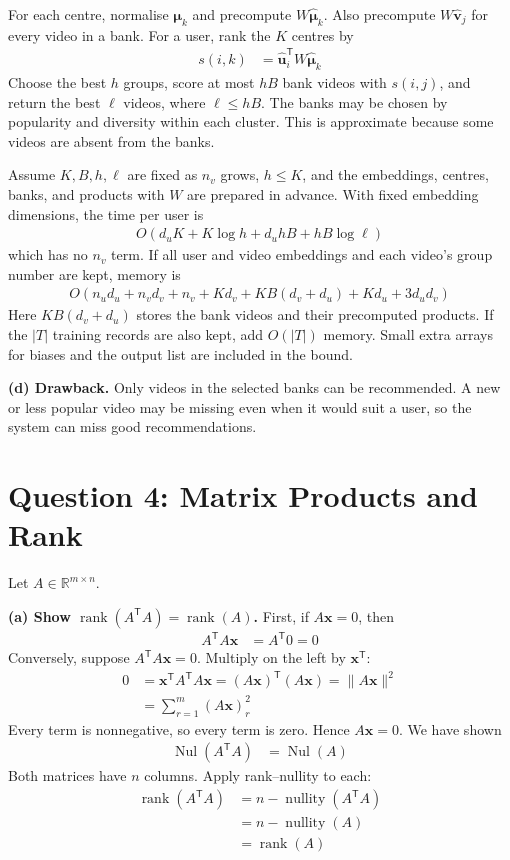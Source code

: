 \documentclass[11pt,a4paper]{article}
\newcommand{\R}{\mathbb{R}}
\newcommand{\norm}[1]{\lVert #1\rVert}
\newcommand{\rank}{\operatorname{rank}}
\newcommand{\nullity}{\operatorname{nullity}}
\newcommand{\Nul}{\operatorname{Nul}}
\begin{document}
For each centre, normalise $\boldsymbol\mu_k$ and precompute $W\widehat{\boldsymbol\mu}_k$. Also precompute $W\widehat{\mathbf v}_j$ for every video in a bank. For a user, rank the $K$ centres by
\begin{align*}
s(i,k)&=\widehat{\mathbf u}_i^{\mathsf T}W\widehat{\boldsymbol\mu}_k
\end{align*}
Choose the best $h$ groups, score at most $hB$ bank videos with $s(i,j)$, and return the best $\ell$ videos, where $\ell\le hB$. The banks may be chosen by popularity and diversity within each cluster. This is approximate because some videos are absent from the banks.

Assume $K,B,h,\ell$ are fixed as $n_v$ grows, $h\le K$, and the embeddings, centres, banks, and products with $W$ are prepared in advance. With fixed embedding dimensions, the time per user is
\begin{align*}
O\!\left(d_uK+K\log h+d_uhB+hB\log\ell\right)
\end{align*}
which has no $n_v$ term. If all user and video embeddings and each video's group number are kept, memory is
\begin{align*}
O\!\left(
n_ud_u+n_vd_v+n_v+Kd_v+KB(d_v+d_u)+Kd_u+3d_ud_v
\right)
\end{align*}
Here $KB(d_v+d_u)$ stores the bank videos and their precomputed products. If the $|T|$ training records are also kept, add $O(|T|)$ memory. Small extra arrays for biases and the output list are included in the bound.

\textbf{(d) Drawback.} Only videos in the selected banks can be recommended. A new or less popular video may be missing even when it would suit a user, so the system can miss good recommendations.

\clearpage
\section*{Question 4: Matrix Products and Rank}
Let $A\in\R^{m\times n}$.

\textbf{(a) Show $\rank(A^{\mathsf T}A)=\rank(A)$.} First, if $A\mathbf x=0$, then
\begin{align*}
A^{\mathsf T}A\mathbf x&=A^{\mathsf T}0=0
\end{align*}
Conversely, suppose $A^{\mathsf T}A\mathbf x=0$. Multiply on the left by $\mathbf x^{\mathsf T}$:
\begin{align*}
0
&=\mathbf x^{\mathsf T}A^{\mathsf T}A\mathbf x
=(A\mathbf x)^{\mathsf T}(A\mathbf x)
=\norm{A\mathbf x}^{2}\\
&=\sum_{r=1}^{m}(A\mathbf x)_r^{2}
\end{align*}
Every term is nonnegative, so every term is zero. Hence $A\mathbf x=0$. We have shown
\begin{align*}
\Nul(A^{\mathsf T}A)&=\Nul(A)
\end{align*}
Both matrices have $n$ columns. Apply rank--nullity to each:
\begin{align*}
\rank(A^{\mathsf T}A)
&=n-\nullity(A^{\mathsf T}A)\\
&=n-\nullity(A)\\
&=\boxed{\rank(A)}
\end{align*}
\end{document}
